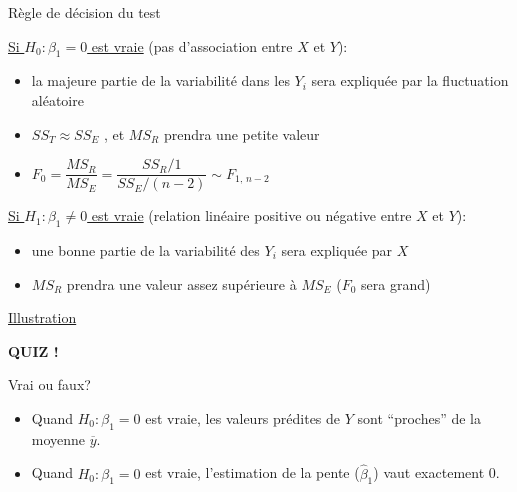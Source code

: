 \documentclass{BeamerTemplate}
\begin{document}
\begin{frame}[t]{Règle de décision du test}

{\small
\underline{Si $H_0: \beta_1=0$ est vraie} (pas d'association entre $X$ et $Y$):
 \begin{itemize}
 \item \alert{la majeure partie de la variabilité dans les $Y_i$ sera expliquée par la fluctuation aléatoire}
\item $SS_T\approx SS_E$ , et $MS_R$ prendra une petite valeur


\item $F_0=\dfrac{MS_R}{MS_E}=\dfrac{SS_{R}/1}{SS_E/(n-2)}\sim F_{1,\,n-2}$
\end{itemize}

\medskip
\underline{Si $H_1: \beta_1\ne0$ est vraie} (relation linéaire positive ou négative entre $X$ et $Y$):

 \begin{itemize}
 \item \alert{une bonne partie de la variabilité des $Y_i$ sera expliquée par $X$}
 \item $MS_R$ prendra une  valeur assez supérieure à $MS_E$ ($F_0$ sera grand)
\end{itemize}

{}
}

\href{https://jmiron.shinyapps.io/ModeleIntro/}{Illustration}
\end{frame}


\begin{frame}[t]{ }

\centerline{\LARGE\bf \alert{QUIZ !}}
\bigskip

Vrai ou faux?

\bigskip
\begin{itemize}\itemsep15mm
 \item Quand $H_0: \beta_1=0$ est vraie, les valeurs prédites de $Y$ sont ``proches'' de la moyenne $\overline y$.

\item Quand $H_0: \beta_1=0$ est vraie, l'estimation de la pente ($\hat\beta_1$) vaut exactement 0.
\end{itemize}


\end{frame}
\end{document}
